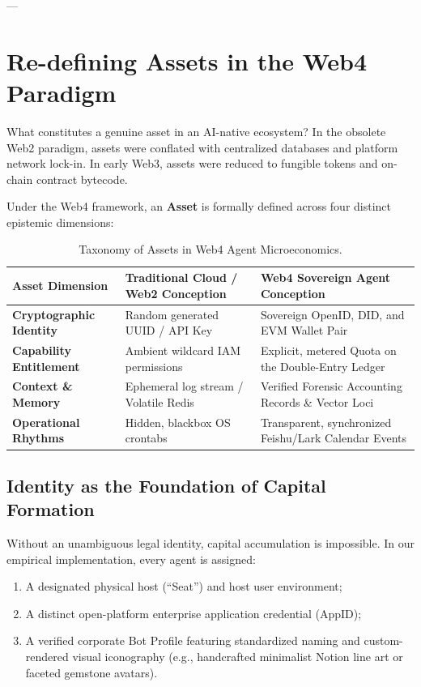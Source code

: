 \documentclass[11pt,a4paper]{article}
\begin{document}
---

\section{Re-defining Assets in the Web4 Paradigm}

What constitutes a genuine asset in an AI-native ecosystem? In the obsolete Web2 paradigm, assets were conflated with centralized databases and platform network lock-in. In early Web3, assets were reduced to fungible tokens and on-chain contract bytecode.

Under the Web4 framework, an \textbf{Asset} is formally defined across four distinct epistemic dimensions:

\begin{table}[htbp]
\centering
\small
\begin{tabular}{lll}
\toprule
\textbf{Asset Dimension} & \textbf{Traditional Cloud / Web2 Conception} & \textbf{Web4 Sovereign Agent Conception} \\
\midrule
\textbf{Cryptographic Identity} & Random generated UUID / API Key & Sovereign OpenID, DID, and EVM Wallet Pair \\
\textbf{Capability Entitlement} & Ambient wildcard IAM permissions & Explicit, metered Quota on the Double-Entry Ledger \\
\textbf{Context \& Memory} & Ephemeral log stream / Volatile Redis & Verified Forensic Accounting Records \& Vector Loci \\
\textbf{Operational Rhythms} & Hidden, blackbox OS crontabs & Transparent, synchronized Feishu/Lark Calendar Events \\
\bottomrule
\end{tabular}
\caption{Taxonomy of Assets in Web4 Agent Microeconomics.}
\end{table}

\subsection{Identity as the Foundation of Capital Formation}
Without an unambiguous legal identity, capital accumulation is impossible. In our empirical implementation, every agent is assigned:
\begin{enumerate}
    \item A designated physical host (``Seat'') and host user environment;
    \item A distinct open-platform enterprise application credential ($\text{AppID}$);
    \item A verified corporate Bot Profile featuring standardized naming and custom-rendered visual iconography (e.g., handcrafted minimalist Notion line art or faceted gemstone avatars).
\end{enumerate}
\end{document}
